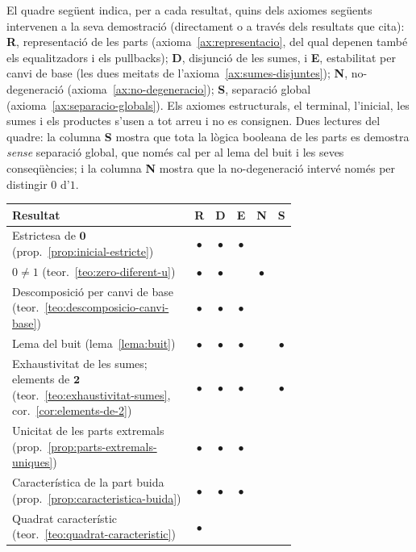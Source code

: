 \begin{observacio}\label{obs:quadre-dependencies-cap3}
El quadre següent indica, per a cada resultat, quins dels axiomes següents intervenen a la seva demostració (directament o a través dels resultats que cita): \textbf{R}, representació de les parts (axioma~\ref{ax:representacio}, del qual depenen també els equalitzadors i els pullbacks); \textbf{D}, disjunció de les sumes, i \textbf{E}, estabilitat per canvi de base (les dues meitats de l'axioma~\ref{ax:sumes-disjuntes}); \textbf{N}, no-degeneració (axioma~\ref{ax:no-degeneracio}); \textbf{S}, separació global (axioma~\ref{ax:separacio-globals}). Els axiomes estructurals, el terminal, l'inicial, les sumes i els productes s'usen a tot arreu i no es consignen. Dues lectures del quadre: la columna \textbf{S} mostra que tota la lògica booleana de les parts es demostra \emph{sense} separació global, que només cal per al lema del buit i les seves conseqüències; i la columna \textbf{N} mostra que la no-degeneració intervé només per distingir \(0\) d'\(1\).
\begin{center}\small
\begin{tabular}{@{}>{\raggedright\arraybackslash}p{0.70\linewidth}ccccc@{}}
\toprule
Resultat & R & D & E & N & S\\
\midrule
Estrictesa de \(\mathbf0\) (prop.~\ref{prop:inicial-estricte}) & \(\bullet\) & \(\bullet\) & \(\bullet\) & & \\
\(0\ne1\) (teor.~\ref{teo:zero-diferent-u}) & \(\bullet\) & \(\bullet\) & & \(\bullet\) & \\
Descomposició per canvi de base (teor.~\ref{teo:descomposicio-canvi-base}) & \(\bullet\) & \(\bullet\) & \(\bullet\) & & \\
Lema del buit (lema~\ref{lema:buit}) & \(\bullet\) & \(\bullet\) & \(\bullet\) & & \(\bullet\) \\
Exhaustivitat de les sumes; elements de \(\mathbf2\) (teor.~\ref{teo:exhaustivitat-sumes}, cor.~\ref{cor:elements-de-2}) & \(\bullet\) & \(\bullet\) & \(\bullet\) & & \(\bullet\) \\
Unicitat de les parts extremals (prop.~\ref{prop:parts-extremals-uniques}) & \(\bullet\) & \(\bullet\) & \(\bullet\) & & \\
Característica de la part buida (prop.~\ref{prop:caracteristica-buida}) & \(\bullet\) & \(\bullet\) & \(\bullet\) & & \\
Quadrat característic (teor.~\ref{teo:quadrat-caracteristic}) & \(\bullet\) & & & & \\

\end{tabular}
\end{center}
\end{observacio}
